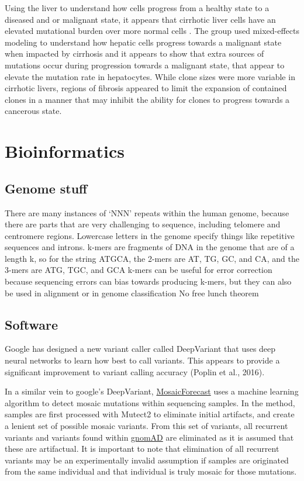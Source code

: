 \documentclass[]{book}
\begin{document}
Using the liver to understand how cells progress from a healthy state to a diseased and or malignant state, it appears that cirrhotic liver cells have an elevated mutational burden over more normal cells \citep{brunner2019somatic}. The group used mixed-effects modeling to understand how hepatic cells progress towards a malignant state when impacted by cirrhosis and it appears to show that extra sources of mutations occur during progression towards a malignant state, that appear to elevate the mutation rate in hepatocytes. While clone sizes were more variable in cirrhotic livers, regions of fibrosis appeared to limit the expansion of contained clones in a manner that may inhibit the ability for clones to progress towards a cancerous state.

\hypertarget{bioinformatics}{%
\chapter{Bioinformatics}\label{bioinformatics}}

\hypertarget{genome-stuff}{%
\section{Genome stuff}\label{genome-stuff}}

There are many instances of `NNN' repeats within the human genome, because there are parts that are very challenging to sequence, including telomere and centromere regions.
Lowercase letters in the genome specify things like repetitive sequences and introns.
k-mers are fragments of DNA in the genome that are of a length k, so for the string ATGCA, the 2-mers are AT, TG, GC, and CA, and the 3-mers are ATG, TGC, and GCA
k-mers can be useful for error correction because sequencing errors can bias towards producing k-mers, but they can also be used in alignment or in genome classification
No free lunch theorem

\hypertarget{software}{%
\section{Software}\label{software}}

Google has designed a new variant caller called DeepVariant that uses deep neural networks to learn how best to call variants. This appears to provide a significant improvement to variant calling accuracy (Poplin et al., 2016).

In a similar vein to google's DeepVariant, \href{'https://github.com/parklab/MosaicForecast'}{MosaicForecast} uses a machine learning algorithm to detect mosaic mutations within sequencing samples. In the method, samples are first processed with Mutect2 to eliminate initial artifacts, and create a lenient set of possible mosaic variants. From this set of variants, all recurrent variants and variants found within \href{'https://gnomad.broadinstitute.org/'}{gnomAD} are eliminated as it is assumed that these are artifactual. It is important to note that elimination of all recurrent variants may be an experimentally invalid assumption if samples are originated from the same individual and that individual is truly mosaic for those mutations.
\end{document}
